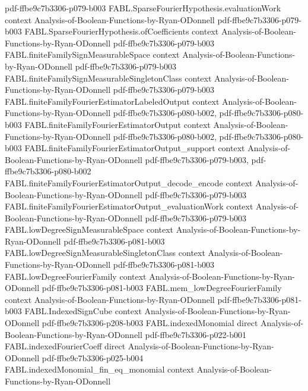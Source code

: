 \begin{theorem}
  {pdf-ffbe9c7b3306-p079-b003}
\proofstep
  {FABL.SparseFourierHypothesis.evaluationWork}
  {context}
  {Analysis-of-Boolean-Functions-by-Ryan-ODonnell}
  {pdf-ffbe9c7b3306-p079-b003}
\proofstep
  {FABL.SparseFourierHypothesis.ofCoefficients}
  {context}
  {Analysis-of-Boolean-Functions-by-Ryan-ODonnell}
  {pdf-ffbe9c7b3306-p079-b003}
\proofstep
  {FABL.finiteFamilySignMeasurableSpace}
  {context}
  {Analysis-of-Boolean-Functions-by-Ryan-ODonnell}
  {pdf-ffbe9c7b3306-p079-b003}
\proofstep
  {FABL.finiteFamilySignMeasurableSingletonClass}
  {context}
  {Analysis-of-Boolean-Functions-by-Ryan-ODonnell}
  {pdf-ffbe9c7b3306-p079-b003}
\proofstep
  {FABL.finiteFamilyFourierEstimatorLabeledOutput}
  {context}
  {Analysis-of-Boolean-Functions-by-Ryan-ODonnell}
  {pdf-ffbe9c7b3306-p080-b002,
    pdf-ffbe9c7b3306-p080-b003}
\proofstep
  {FABL.finiteFamilyFourierEstimatorOutput}
  {context}
  {Analysis-of-Boolean-Functions-by-Ryan-ODonnell}
  {pdf-ffbe9c7b3306-p080-b002,
    pdf-ffbe9c7b3306-p080-b003}
\proofstep
  {FABL.finiteFamilyFourierEstimatorOutput_support}
  {context}
  {Analysis-of-Boolean-Functions-by-Ryan-ODonnell}
  {pdf-ffbe9c7b3306-p079-b003,
    pdf-ffbe9c7b3306-p080-b002}
\proofstep
  {FABL.finiteFamilyFourierEstimatorOutput_decode_encode}
  {context}
  {Analysis-of-Boolean-Functions-by-Ryan-ODonnell}
  {pdf-ffbe9c7b3306-p079-b003}
\proofstep
  {FABL.finiteFamilyFourierEstimatorOutput_evaluationWork}
  {context}
  {Analysis-of-Boolean-Functions-by-Ryan-ODonnell}
  {pdf-ffbe9c7b3306-p079-b003}
\proofstep
  {FABL.lowDegreeSignMeasurableSpace}
  {context}
  {Analysis-of-Boolean-Functions-by-Ryan-ODonnell}
  {pdf-ffbe9c7b3306-p081-b003}
\proofstep
  {FABL.lowDegreeSignMeasurableSingletonClass}
  {context}
  {Analysis-of-Boolean-Functions-by-Ryan-ODonnell}
  {pdf-ffbe9c7b3306-p081-b003}
\proofstep
  {FABL.lowDegreeFourierFamily}
  {context}
  {Analysis-of-Boolean-Functions-by-Ryan-ODonnell}
  {pdf-ffbe9c7b3306-p081-b003}
\proofstep
  {FABL.mem_lowDegreeFourierFamily}
  {context}
  {Analysis-of-Boolean-Functions-by-Ryan-ODonnell}
  {pdf-ffbe9c7b3306-p081-b003}
\proofstep
  {FABL.IndexedSignCube}
  {context}
  {Analysis-of-Boolean-Functions-by-Ryan-ODonnell}
  {pdf-ffbe9c7b3306-p208-b003}
\proofstep
  {FABL.indexedMonomial}
  {direct}
  {Analysis-of-Boolean-Functions-by-Ryan-ODonnell}
  {pdf-ffbe9c7b3306-p022-b001}
\proofstep
  {FABL.indexedFourierCoeff}
  {direct}
  {Analysis-of-Boolean-Functions-by-Ryan-ODonnell}
  {pdf-ffbe9c7b3306-p025-b004}
\proofstep
  {FABL.indexedMonomial_fin_eq_monomial}
  {context}
  {Analysis-of-Boolean-Functions-by-Ryan-ODonnell}

\end{theorem}
